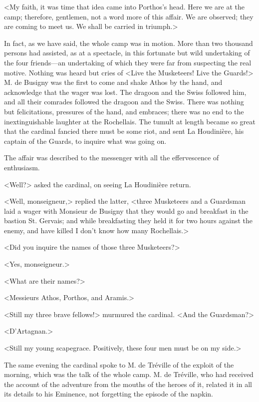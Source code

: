 <My faith, it was time that idea came into Porthos's head. Here we are at the camp; therefore, gentlemen, not a word more of this affair. We are observed; they are coming to meet us. We shall be carried in triumph.> 

In fact, as we have said, the whole camp was in motion. More than two thousand persons had assisted, as at a spectacle, in this fortunate but wild undertaking of the four friends---an undertaking of which they were far from suspecting the real motive. Nothing was heard but cries of <Live the Musketeers! Live the Guards!> M. de Busigny was the first to come and shake Athos by the hand, and acknowledge that the wager was lost. The dragoon and the Swiss followed him, and all their comrades followed the dragoon and the Swiss. There was nothing but felicitations, pressures of the hand, and embraces; there was no end to the inextinguishable laughter at the Rochellais. The tumult at length became so great that the cardinal fancied there must be some riot, and sent La Houdinière, his captain of the Guards, to inquire what was going on. 

The affair was described to the messenger with all the effervescence of enthusiasm. 

<Well?> asked the cardinal, on seeing La Houdinière return. 

<Well, monseigneur,> replied the latter, <three Musketeers and a Guardsman laid a wager with Monsieur de Busigny that they would go and breakfast in the bastion St. Gervais; and while breakfasting they held it for two hours against the enemy, and have killed I don't know how many Rochellais.> 

<Did you inquire the names of those three Musketeers?> 

<Yes, monseigneur.> 

<What are their names?> 

<Messieurs Athos, Porthos, and Aramis.> 

<Still my three brave fellows!> murmured the cardinal. <And the Guardsman?> 

<D'Artagnan.> 

<Still my young scapegrace. Positively, these four men must be on my side.> 

The same evening the cardinal spoke to M. de Tréville of the exploit of the morning, which was the talk of the whole camp. M. de Tréville, who had received the account of the adventure from the mouths of the heroes of it, related it in all its details to his Eminence, not forgetting the episode of the napkin. 

